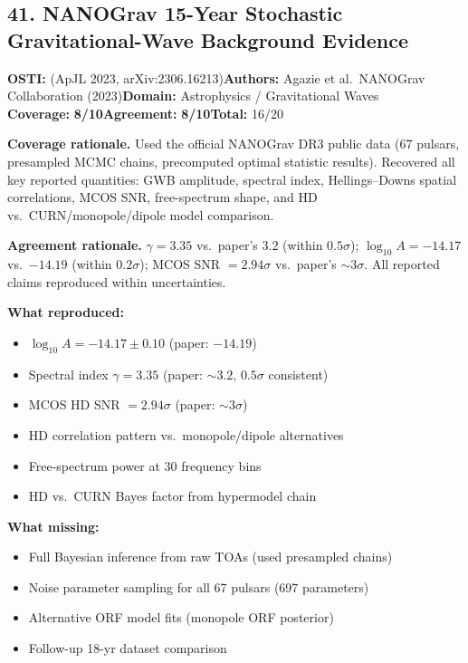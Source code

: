 \documentclass[11pt]{article}
\newcommand{\scorebadge}[2]{\textbf{#1:} \textbf{#2/10}}
\begin{document}
\subsection{41. NANOGrav 15-Year Stochastic Gravitational-Wave Background Evidence}
\textbf{OSTI:} (ApJL 2023, arXiv:2306.16213)\quad\textbf{Authors:} Agazie et al.\ NANOGrav Collaboration (2023)\quad\textbf{Domain:} Astrophysics / Gravitational Waves\\
\scorebadge{Coverage}{8}\quad\scorebadge{Agreement}{8}\quad\textbf{Total:} 16/20\par\smallskip
\noindent\textbf{Coverage rationale.} Used the official NANOGrav DR3 public data (67 pulsars, presampled MCMC chains, precomputed optimal statistic results). Recovered all key reported quantities: GWB amplitude, spectral index, Hellings--Downs spatial correlations, MCOS SNR, free-spectrum shape, and HD vs.\ CURN/monopole/dipole model comparison.\par
\noindent\textbf{Agreement rationale.} $\gamma = 3.35$ vs.\ paper's 3.2 (within $0.5\sigma$); $\log_{10}A = -14.17$ vs.\ $-14.19$ (within $0.2\sigma$); MCOS SNR $= 2.94\sigma$ vs.\ paper's $\sim 3\sigma$. All reported claims reproduced within uncertainties.\par\smallskip
\noindent\textbf{What reproduced:}
\begin{itemize}[leftmargin=1.4em,itemsep=0.2em,topsep=0.2em]
\item $\log_{10}A = -14.17 \pm 0.10$ (paper: $-14.19$)
\item Spectral index $\gamma = 3.35$ (paper: $\sim 3.2$, $0.5\sigma$ consistent)
\item MCOS HD SNR $= 2.94\sigma$ (paper: $\sim 3\sigma$)
\item HD correlation pattern vs.\ monopole/dipole alternatives
\item Free-spectrum power at 30 frequency bins
\item HD vs.\ CURN Bayes factor from hypermodel chain
\end{itemize}
\noindent\textbf{What missing:}
\begin{itemize}[leftmargin=1.4em,itemsep=0.2em,topsep=0.2em]
\item Full Bayesian inference from raw TOAs (used presampled chains)
\item Noise parameter sampling for all 67 pulsars (697 parameters)
\item Alternative ORF model fits (monopole ORF posterior)
\item Follow-up 18-yr dataset comparison
\end{itemize}
\end{document}
